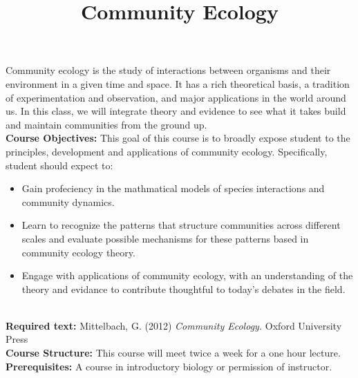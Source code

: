 \documentclass{article}\usepackage[]{graphicx}\usepackage[]{color}
\begin{document}
\title{Community Ecology}
\date{}
\maketitle{}
Community ecology is the study of interactions between organisms and their environment in a given time and space. It has a rich theoretical basis, a tradition of experimentation and observation, and major applications in the world around us. In this class, we will integrate theory and evidence to see what it takes build and maintain communities from the ground up. \\

\textbf{Course Objectives:} This goal of this course is to broadly expose student to the principles, development and applications of community ecology. Specifically, student should expect to:
\begin{itemize}
\item Gain profeciency in the mathmatical models of species interactions and community dynamics.
\item Learn to recognize the patterns that structure communities across different scales and evaluate possible mechanisms for these patterns based in community ecology theory.
\item  Engage with applications of community ecology, with an understanding of the theory and evidance to contribute thoughtful to today's debates in the field.
\end{itemize}\\

\textbf{Required text:} Mittelbach, G. (2012) \textit{Community Ecology.} Oxford University Press \\

\textbf{Course Structure:} This course will meet twice a week for a one hour lecture.\\

\textbf{Prerequisites:} A course in introductory biology or permission of instructor.\\
\end{document}
